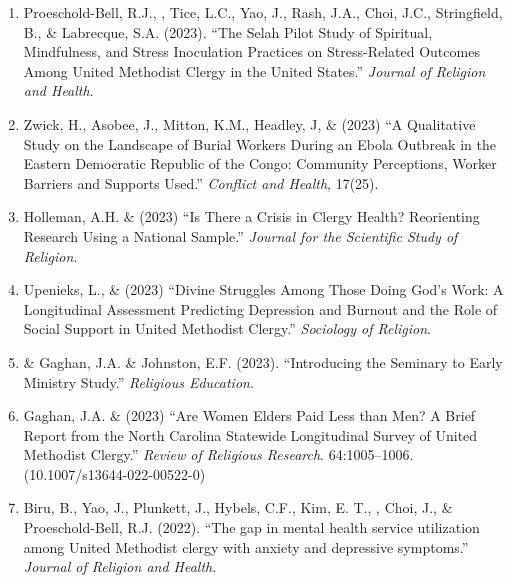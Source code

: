 \begin{enumerate}
\item Proeschold-Bell, R.J., \Eagle, Tice, L.C., Yao, J., Rash, J.A., Choi, J.C., Stringfield, B., \& Labrecque, S.A. (2023). ``The Selah Pilot Study of Spiritual, Mindfulness, and Stress Inoculation Practices on Stress-Related Outcomes Among United Methodist Clergy in the United States.'' \textit{Journal of Religion and Health}. 
	
\item Zwick, H., Asobee, J., Mitton, K.M., Headley, J, \& \Eagle\CS \hspace{0.1em} (2023) ``A Qualitative Study on the Landscape of Burial Workers During an Ebola Outbreak in the Eastern Democratic Republic of the Congo: Community Perceptions, Worker Barriers and Supports Used.''  \textit{Conflict and Health}, 17(25). 

\item Holleman, A.H. \& \Eagle\hspace{.01em} (2023) ``Is There a Crisis in Clergy Health? Reorienting Research Using a National Sample.'' \textit{Journal for the Scientific Study of Religion}. 

\item Upenieks, L., \& \Eagle\hspace{0.1em} (2023) ``Divine Struggles Among Those Doing God’s Work: A Longitudinal Assessment Predicting Depression and Burnout and the Role of Social Support in United Methodist Clergy.'' \textit{Sociology of Religion}.  

\item \Eagle \hspace{.01em} \& Gaghan, J.A. \& Johnston, E.F. (2023). ``Introducing the Seminary to Early Ministry Study.''  \textit{Religious Education}. 

\item Gaghan, J.A. \& \Eagle \hspace{0.1em} (2023) ``Are Women Elders Paid Less than Men? A Brief Report from the North Carolina Statewide Longitudinal Survey of United Methodist Clergy.'' \textit{Review of Religious Research}. 64:1005--1006. \doi(10.1007/s13644-022-00522-0)
	
\item Biru, B., Yao, J., Plunkett, J., Hybels, C.F., Kim, E. T., \Eagle, Choi, J., \& Proeschold-Bell, R.J. (2022). ``The gap in mental health service utilization among United Methodist clergy with anxiety and depressive symptoms.'' \textit{Journal of Religion and Health}. 
	

\end{enumerate}
